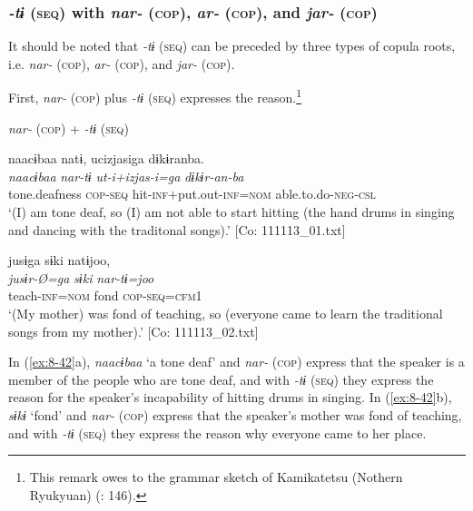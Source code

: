 \subsubsection{\textit{-tɨ} (\textsc{seq}) with \textit{nar-} (\textsc{cop}), \textit{ar-} (\textsc{cop}), and \textit{jar-} (\textsc{cop})}

It should be noted that \textit{-tɨ} (\textsc{seq}) can be preceded by three types of copula roots, i.e. \textit{nar-} (\textsc{cop}), \textit{ar-} (\textsc{cop}), and \textit{jar-} (\textsc{cop}).

First, \textit{nar-} (\textsc{cop}) plus \textit{-tɨ} (\textsc{seq}) expresses the reason.\footnote{This remark owes to the grammar sketch of Kamikatetsu (Nothern Ryukyuan) (\citealt{ShirataEtAl2011}: 146).}

\ea\label{ex:8-42}
 \textit{nar-} (\textsc{cop}) + \textit{-tɨ} (\textsc{seq})

\ea
{\TM}
\glll  naacɨbaa  natɨ,  ucizjasiga  dɨkɨranba.\\
\textit{naacɨbaa}  \textit{nar-tɨ}  \textit{ut-i+izjas-i=ga}  \textit{dɨkɨr-an-ba}\\
tone.deafness  \textsc{cop}-\textsc{seq}  hit-\textsc{inf}+put.out-\textsc{inf}=\textsc{nom}  able.to.do-\textsc{neg}-\textsc{csl}\\
\glt ‘(I) am tone deaf, so (I) am not able to start hitting (the hand drums in singing and dancing with the traditonal songs).’ [Co: 111113\_01.txt]

\ex  [= (\ref{ex:4-13}c)]

{\TM}
\glll  jusɨga  sɨki  natɨjoo,\\
\textit{jusɨr-Ø=ga}  \textit{sɨki}  \textit{nar-tɨ=joo}\\
teach-\textsc{inf}=\textsc{nom}  fond  \textsc{cop}-\textsc{seq}=\textsc{cfm1}\\
\glt ‘(My mother) was fond of teaching, so (everyone came to learn the traditional songs from my mother).’ [Co: 111113\_02.txt]
\z
\z

In (\ref{ex:8-42}a), \textit{naacɨbaa} ‘a tone deaf’ and \textit{nar-} (\textsc{cop}) express that the speaker is a member of the people who are tone deaf, and with \textit{-tɨ} (\textsc{seq}) they express the reason for the speaker’s incapability of hitting drums in singing. In (\ref{ex:8-42}b), \textit{sɨkɨ} ‘fond’ and \textit{nar-} (\textsc{cop}) express that the speaker’s mother was fond of teaching, and with \textit{-tɨ} (\textsc{seq}) they express the reason why everyone came to her place.

